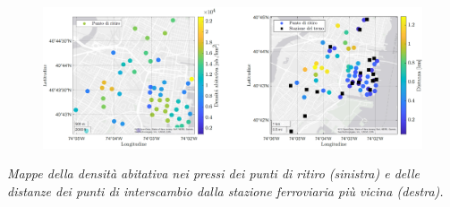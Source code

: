 \begin{frame}
	\centering
			\begin{figure}
				\includegraphics[width=\textwidth]{../Tesi/Immagini/4. Caso di studio/Mappe/Mappa punti ritiro e stazioni treno e densita ab AGGREGATA}
			\end{figure}
	\vspace{-5px}
	\textit{Mappe della densità abitativa nei pressi dei punti di ritiro (sinistra) e delle distanze dei punti di interscambio dalla stazione ferroviaria più vicina (destra).}
\end{frame}

